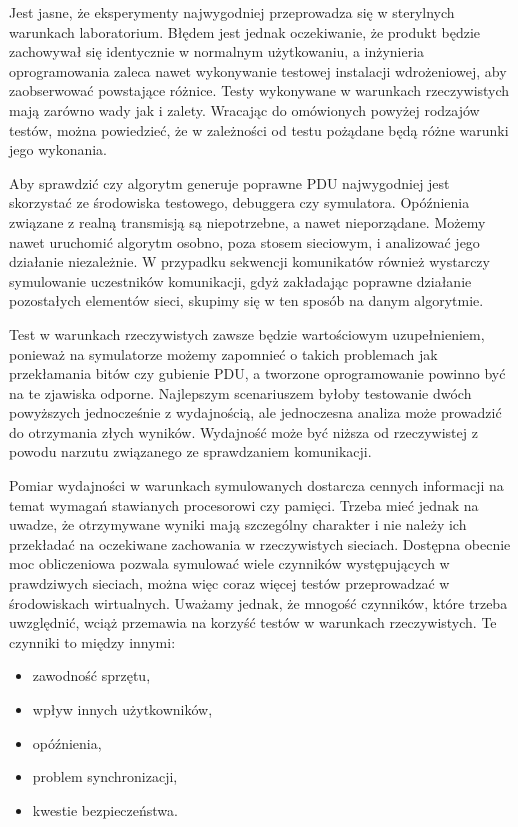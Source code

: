 \documentclass[00-praca-magisterska.tex]{subfiles}
\begin{document}
Jest jasne, że eksperymenty najwygodniej przeprowadza się w sterylnych
warunkach laboratorium. Błędem jest jednak oczekiwanie, że produkt będzie
zachowywał się identycznie w normalnym użytkowaniu, a inżynieria oprogramowania
zaleca nawet wykonywanie testowej instalacji wdrożeniowej, aby zaobserwować
powstające różnice. Testy wykonywane w warunkach rzeczywistych mają zarówno
wady jak i zalety.  Wracając do omówionych powyżej rodzajów testów, można
powiedzieć, że w zależności od testu pożądane będą różne warunki jego
wykonania.

Aby sprawdzić czy algorytm generuje poprawne PDU najwygodniej jest skorzystać
ze środowiska testowego, debuggera czy symulatora. Opóźnienia związane z realną
transmisją są niepotrzebne, a nawet nieporządane. Możemy nawet uruchomić
algorytm osobno, poza stosem sieciowym, i analizować jego działanie
niezależnie. W przypadku sekwencji komunikatów również wystarczy symulowanie
uczestników komunikacji, gdyż zakładając poprawne działanie pozostałych
elementów sieci, skupimy się w ten sposób na danym algorytmie.

Test w warunkach rzeczywistych zawsze będzie wartościowym uzupełnieniem,
ponieważ na symulatorze możemy zapomnieć o takich problemach jak przekłamania
bitów czy gubienie PDU, a tworzone oprogramowanie powinno być na te zjawiska
odporne. Najlepszym scenariuszem byłoby testowanie dwóch powyższych
jednocześnie z wydajnością, ale jednoczesna analiza może prowadzić do
otrzymania złych wyników. Wydajność może być niższa od rzeczywistej z powodu
narzutu związanego ze sprawdzaniem komunikacji.

Pomiar wydajności w warunkach symulowanych dostarcza cennych informacji na
temat wymagań stawianych procesorowi czy pamięci. Trzeba mieć jednak na uwadze,
że otrzymywane wyniki mają szczególny charakter i nie należy ich przekładać na
oczekiwane zachowania w rzeczywistych sieciach. Dostępna obecnie moc
obliczeniowa pozwala symulować wiele czynników występujących w prawdziwych
sieciach, można więc coraz więcej testów przeprowadzać w środowiskach
wirtualnych. Uważamy jednak, że mnogość czynników, które trzeba uwzględnić,
wciąż przemawia na korzyść testów w warunkach rzeczywistych. Te czynniki to
między innymi:
\begin{itemize}
\item zawodność sprzętu,
\item wpływ innych użytkowników,
\item opóźnienia,
\item problem synchronizacji,
\item kwestie bezpieczeństwa.
\end{itemize}
\end{document}
